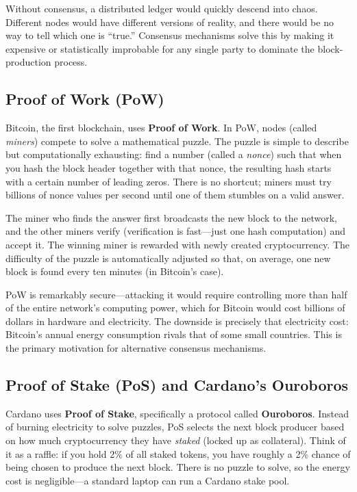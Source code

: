 Without consensus, a distributed ledger would quickly descend into chaos.
Different nodes would have different versions of reality, and there would be
no way to tell which one is ``true.''  Consensus mechanisms solve this by
making it expensive or statistically improbable for any single party to
dominate the block-production process.

\subsection{Proof of Work (PoW)}

Bitcoin, the first blockchain, uses \textbf{Proof of Work}.  In PoW, nodes
(called \emph{miners}) compete to solve a mathematical puzzle.  The puzzle is
simple to describe but computationally exhausting: find a number (called a
\emph{nonce}) such that when you hash the block header together with that
nonce, the resulting hash starts with a certain number of leading zeros.
There is no shortcut; miners must try billions of nonce values per second
until one of them stumbles on a valid answer.

The miner who finds the answer first broadcasts the new block to the network,
and the other miners verify (verification is fast---just one hash
computation) and accept it.  The winning miner is rewarded with
newly created cryptocurrency.  The difficulty of the puzzle is automatically
adjusted so that, on average, one new block is found every ten minutes
(in Bitcoin's case).

PoW is remarkably secure---attacking it would require controlling more than
half of the entire network's computing power, which for Bitcoin would cost
billions of dollars in hardware and electricity.  The downside is precisely
that electricity cost: Bitcoin's annual energy consumption rivals that of
some small countries.  This is the primary motivation for alternative
consensus mechanisms.

\subsection{Proof of Stake (PoS) and Cardano's Ouroboros}

Cardano uses \textbf{Proof of Stake}, specifically a protocol called
\textbf{Ouroboros}.  Instead of burning electricity to solve puzzles, PoS
selects the next block producer based on how much cryptocurrency they have
\emph{staked} (locked up as collateral).  Think of it as a raffle: if you
hold 2\% of all staked tokens, you have roughly a 2\% chance of being chosen
to produce the next block.  There is no puzzle to solve, so the energy cost
is negligible---a standard laptop can run a Cardano stake pool.

